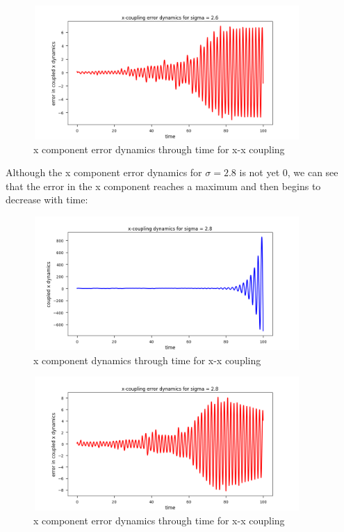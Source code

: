 \documentclass{article}
\begin{document}
\begin{figure}[H]
\centering
\includegraphics[width = 4in, height = 2in]{x_coupling_x_errors_s26.png}
\caption{x component error dynamics through time for x-x coupling}
\end{figure}

Although the x component error dynamics for $\sigma = 2.8$ is not yet 0, we can see that the error in the x component reaches a maximum and then begins to decrease with time:

\begin{figure}[H]
\centering
\includegraphics[width = 4in, height = 2in]{x_coupled_x_dynamics_s28.png}
\caption{x component dynamics through time for x-x coupling}
\end{figure}

\begin{figure}[H]
\centering
\includegraphics[width = 4in, height = 2in]{x_coupling_x_errors_s28.png}
\caption{x component error dynamics through time for x-x coupling}
\end{figure}
\end{document}
